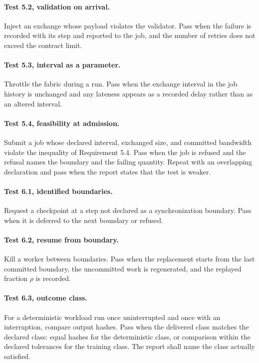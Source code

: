 \documentclass[11pt,openany]{book}
\theoremstyle{remark}
\begin{document}
\paragraph{Test 5.2, validation on arrival.} Inject an exchange whose payload violates the validator. Pass when the failure is recorded with its step and reported to the job, and the number of retries does not exceed the contract limit.

\paragraph{Test 5.3, interval as a parameter.} Throttle the fabric during a run. Pass when the exchange interval in the job history is unchanged and any lateness appears as a recorded delay rather than as an altered interval.

\paragraph{Test 5.4, feasibility at admission.} Submit a job whose declared interval, exchanged size, and committed bandwidth violate the inequality of Requirement 5.4. Pass when the job is refused and the refusal names the boundary and the failing quantity. Repeat with an overlapping declaration and pass when the report states that the test is weaker.

\paragraph{Test 6.1, identified boundaries.} Request a checkpoint at a step not declared as a synchronization boundary. Pass when it is deferred to the next boundary or refused.

\paragraph{Test 6.2, resume from boundary.} Kill a worker between boundaries. Pass when the replacement starts from the last committed boundary, the uncommitted work is regenerated, and the replayed fraction $\rho$ is recorded.

\paragraph{Test 6.3, outcome class.} For a deterministic workload run once uninterrupted and once with an interruption, compare output hashes. Pass when the delivered class matches the declared class: equal hashes for the deterministic class, or comparison within the declared tolerances for the training class. The report shall name the class actually satisfied.
\end{document}
